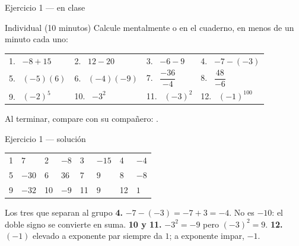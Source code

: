 \documentclass[aspectratio=169,10pt]{beamer}
\begin{document}
\begin{frame}{Ejercicio 1 — en clase}
  \begin{alertblock}{Individual (10 minutos)}
    \scriptsize
    Calcule mentalmente o en el cuaderno, en menos de un minuto cada uno:

    \vspace{0.25cm}
    \centering
    \begin{tabular}{@{}llll@{}}
      1. \ $-8 + 15$ & 2. \ $12 - 20$ & 3. \ $-6 - 9$ &
      4. \ $-7 - (-3)$ \\[0.7em]
      5. \ $(-5)(6)$ & 6. \ $(-4)(-9)$ & 7. \ $\dfrac{-36}{-4}$ &
      8. \ $\dfrac{48}{-6}$ \\[0.9em]
      9. \ $(-2)^5$ & 10. \ $-3^2$ & 11. \ $(-3)^2$ &
      12. \ $(-1)^{100}$ \\
    \end{tabular}

    \vspace{0.25cm}
    \raggedright
    Al terminar, compare con su compañero: .
  \end{alertblock}
\end{frame}

\begin{frame}{Ejercicio 1 — solución}
  \scriptsize
  \begin{center}
  \begin{tabular}{@{}llllllll@{}}
    \toprule
    1 & $7$ & 2 & $-8$ & 3 & $-15$ & 4 & $-4$ \\
    5 & $-30$ & 6 & $36$ & 7 & $9$ & 8 & $-8$ \\
    9 & $-32$ & 10 & $-9$ & 11 & $9$ & 12 & $1$ \\
    \bottomrule
  \end{tabular}
  \end{center}

  \vspace{0.15cm}
  \begin{alertblock}{Los tres que separan al grupo}
    \scriptsize
    \textbf{4.} $-7-(-3) = -7+3 = -4$. No es $-10$: el doble signo se convierte
    en suma. \quad
    \textbf{10 y 11.} $-3^2 = -9$ pero $(-3)^2 = 9$.  \quad
    \textbf{12.} $(-1)$ elevado a exponente par siempre da $1$; a exponente
    impar, $-1$.
  \end{alertblock}
\end{frame}
\end{document}
